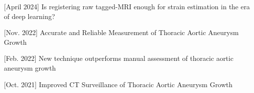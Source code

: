 

\begin{cventries}

 \cventry
    {} %
    {} %
    {} %
    {} %
    {\vspace{-2em}
      \begin{cvitems} %
      	\item{[April 2024] Is registering raw tagged-MRI enough for strain estimation in the era of deep learning?} \href{https://www.rsipvision.com/ComputerVisionNews-2024April/40/}{\color{cyan}{[\,Computer Vision News\,]}}
      \item{[Nov. 2022] Accurate and Reliable Measurement of Thoracic Aortic Aneurysm Growth} \href{https://sinews.siam.org/Details-Page/accurate-and-reliable-measurement-of-thoracic-aortic-aneurysm-growth}{\color{cyan}{[\,SIAM News \,]}}
     \item{[Feb. 2022] New technique outperforms manual assessment of thoracic aortic aneurysm growth}
     \href{https://vascularnews.com/vascular-deformation-mapping/}{\color{cyan}{[\,Vascular News \,]}}
     \item{[Oct. 2021]  Improved CT Surveillance of Thoracic Aortic Aneurysm Growth}
     \href{https://pubs.rsna.org/doi/10.1148/radiol.2021212122}{}
  \end{cvitems}
    }
    
\end{cventries}


%
%
